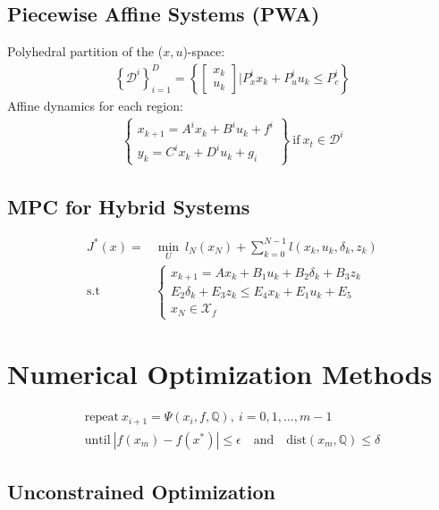 \documentclass[a4paper,landscape,8pt,fleqn]{scrartcl}
\newcommand{\Me}[1]{\begin{bmatrix}#1\end{bmatrix}} %
\newcommand{\Mg}[1]{\begin{Bmatrix}#1\end{Bmatrix}} %
\newcommand{\Lbrace}[1]{\left\{ \begin{array}{ll}#1\end{array}\right.}
\newcommand{\mb}[1]{\mathbb{#1}}
\newcommand{\mc}[1]{\mathcal{#1}}
\begin{document}
\begin{multicols}{3}
\subsection{Piecewise Affine Systems (PWA)}
Polyhedral partition of the ($x,u$)-space:
\begin{align*}
	\left\{\mc{D}^i\right\}_{i=1}^D = \left\{ \Me{x_k\\u_k} | P_x^i x_k + P_u^i u_k \leq P_c^i\right\}
\end{align*}
Affine dynamics for each region:
\begin{align*}
	\Mg{x_{k+1} = A^i x_k + B^i u_k + f^i \\ y_k = C^i x_k + D^i u_k + g_i} \mathrm{~if~} x_t \in \mc{D}^i
\end{align*}
\subsection{MPC for Hybrid Systems}
\begin{align*}
	J^*(x)=&\min_U ~l_N (x_N) + \sum_{k=0}^{N-1} l(x_k,u_k,\delta_k,z_k)\\
	\mathrm{s.t}& \Lbrace{x_{k+1}=A x_k + B_1 u_k + B_2 \delta_k + B_3 z_k\\ E_2 \delta_k + E_3 z_k \leq E_4 x_k + E_1 u_k + E_5\\x_N \in \mc{X}_f}
\end{align*}
\section{Numerical Optimization Methods}
\begin{align*}
	\mathrm{repeat~} x_{i+1} = \Psi(x_i,f,\mb{Q}),~ i=0,1,\dots,m-1\\
	\mathrm{until~} |f(x_m) - f(x^*)| \leq \epsilon \mathrm{\quad and \quad} \mathrm{dist}(x_m,\mb{Q}) \leq \delta
\end{align*}
\subsection{Unconstrained Optimization}

\end{multicols}
\end{document}
